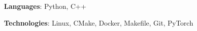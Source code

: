 
\begin{cvparagraph}

\textbf{Languages}: Python, C++

\textbf{Technologies}: Linux, CMake, Docker, Makefile, Git, PyTorch


\end{cvparagraph}
